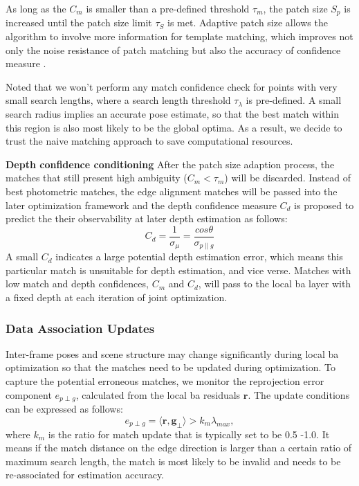 As long as the $C_{m}$ is smaller than a pre-defined threshold
$\tau_{m}$, the patch size $S_p$ is increased until the patch size limit
$\tau_S$ is met. 
Adaptive patch size allows the algorithm to involve more information for template matching, which improves not only the noise resistance of patch matching \cite{engel2017direct} but also the accuracy of confidence measure \cite{brandao2015stereo}. 

Noted that we won't perform any match confidence check for points with very small search lengths, where a search length threshold $\tau_{\lambda}$ is pre-defined. 
A small search radius implies an accurate pose estimate, so that the best match within this region is also most likely to be the global optima. 
As a result, we decide to trust the naive matching approach to save computational resources. 

\noindent \textbf{Depth confidence conditioning}
After the patch size adaption process, the matches that still present high ambiguity ($C_{m} < \tau_{m}$) will be discarded. 
Instead of best photometric matches, the edge alignment matches will be passed into the later optimization framework and the depth confidence measure $C_d$ is proposed to predict the their observability at later depth estimation as follows:
\begin{equation} \label{eq:edge_depthconfidence} 
C_d = \frac{1}{\sigma_{\mu}} =  \frac{cos \theta}{\sigma_{p \| g}}
\end{equation}
A small $C_d$ indicates a large potential depth estimation error, which means this particular match is unsuitable for depth estimation, and vice verse. Matches with low match and depth confidences, $C_m$ and $C_d$, will pass to the local \acrshort{ba} layer with a fixed depth at each iteration of joint optimization. 

\subsubsection{Data Association Updates}
Inter-frame poses and scene structure may change significantly during local \acrshort{ba} optimization so that the matches need to be updated during optimization. To capture the potential erroneous matches, we monitor the reprojection error component $e_{p \perp g}$, calculated from the local \acrshort{ba} residuals $\mathbf{r}$. The update conditions can be expressed as follows:
\begin{equation} \label{eq:edge_distancecheck} 
e_{p \perp g} = \langle \mathbf{r} , \mathbf{g}_{\perp} \rangle > k_m \lambda_{max},
\end{equation}
where $k_m$ is the ratio for match update that is typically set to be 0.5 -1.0. It means if the match distance on the edge direction is larger than a certain ratio of maximum search length, the match is most likely to be invalid and needs to be re-associated for estimation accuracy.  

